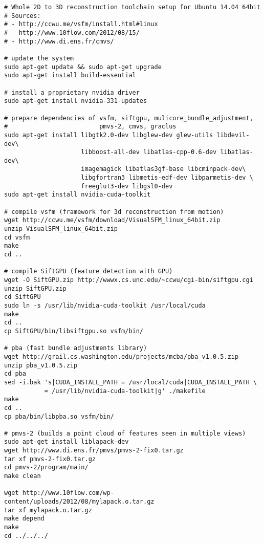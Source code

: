 \begin{verbatim} 
# Whole 2D to 3D reconstruction toolchain setup for Ubuntu 14.04 64bit
# Sources: 
# - http://ccwu.me/vsfm/install.html#linux
# - http://www.10flow.com/2012/08/15/
# - http://www.di.ens.fr/cmvs/

# update the system
sudo apt-get update && sudo apt-get upgrade
sudo apt-get install build-essential

# install a proprietary nvidia driver
sudo apt-get install nvidia-331-updates

# prepare dependencies of vsfm, siftgpu, mulicore_bundle_adjustment, 
#                         pmvs-2, cmvs, graclus
sudo apt-get install libgtk2.0-dev libglew-dev glew-utils libdevil-dev\
                     libboost-all-dev libatlas-cpp-0.6-dev libatlas-dev\
                     imagemagick libatlas3gf-base libcminpack-dev\
                     libgfortran3 libmetis-edf-dev libparmetis-dev \
                     freeglut3-dev libgsl0-dev
sudo apt-get install nvidia-cuda-toolkit

# compile vsfm (framework for 3d reconstruction from motion)
wget http://ccwu.me/vsfm/download/VisualSFM_linux_64bit.zip
unzip VisualSFM_linux_64bit.zip
cd vsfm
make 
cd ..

# compile SiftGPU (feature detection with GPU)
wget -O SiftGPU.zip http://wwwx.cs.unc.edu/~ccwu/cgi-bin/siftgpu.cgi
unzip SiftGPU.zip
cd SiftGPU
sudo ln -s /usr/lib/nvidia-cuda-toolkit /usr/local/cuda
make
cd ..
cp SiftGPU/bin/libsiftgpu.so vsfm/bin/

# pba (fast bundle adjustments library)
wget http://grail.cs.washington.edu/projects/mcba/pba_v1.0.5.zip 
unzip pba_v1.0.5.zip
cd pba
sed -i.bak 's|CUDA_INSTALL_PATH = /usr/local/cuda|CUDA_INSTALL_PATH \
           = /usr/lib/nvidia-cuda-toolkit|g' ./makefile
make
cd ..
cp pba/bin/libpba.so vsfm/bin/

# pmvs-2 (builds a point cloud of features seen in multiple views)
sudo apt-get install liblapack-dev
wget http://www.di.ens.fr/pmvs/pmvs-2-fix0.tar.gz
tar xf pmvs-2-fix0.tar.gz
cd pmvs-2/program/main/
make clean

wget http://www.10flow.com/wp-content/uploads/2012/08/mylapack.o.tar.gz
tar xf mylapack.o.tar.gz
make depend
make
cd ../../../
\end{verbatim}


